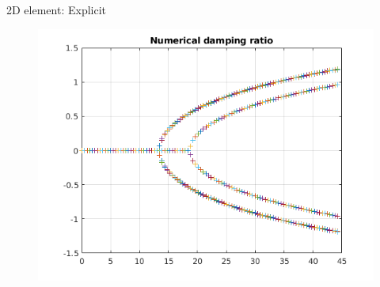\begin{frame}{2D element: Explicit}
\begin{figure}[ht]
\begin{minipage}[b]{0.5\linewidth}
    \includegraphics[scale=.35]{images/2D-exp-4.png} \\
  \end{minipage} 
\end{figure}
\end{frame}

